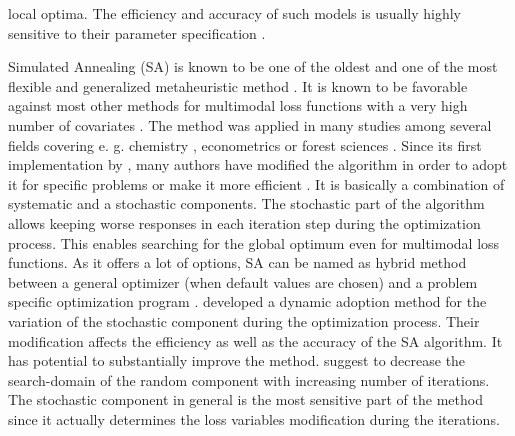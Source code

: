 local optima. The efficiency and accuracy of such models is usually highly sensitive to their parameter specification \citep{corana_1987}.

Simulated Annealing (SA) \citep{kirkpatrick_1983} is known to be one of the oldest and one of the most flexible and generalized metaheuristic method \citep{blum_2003}. It is known to be favorable against most other methods for multimodal loss functions with a very high number of covariates \citep{corana_1987}. The method was applied in many studies among several fields covering e. g. chemistry \citep{agostini_2006}, econometrics \citep{ingber_1993} or forest sciences \citep{baskent_2002}. Since its first implementation by \citet{kirkpatrick_1983}, many authors have modified the algorithm in order to adopt it for specific problems \citep[e. g.][]{desarbo_1989, goffe_1996} or make it more efficient \citep[e. g.][]{xiang_2013}. It is basically a combination of systematic and a stochastic components. The stochastic part of the algorithm allows keeping worse responses in each iteration step during the optimization process. This enables searching for the global optimum even for multimodal loss functions. As it offers a lot of options, SA can be named as hybrid method between a general optimizer (when default values are chosen) and a problem specific optimization program \citep{wegener_2005}. \citet{corana_1987} developed a dynamic adoption method for the variation of the stochastic component during the optimization process. Their modification affects the efficiency as well as the accuracy of the SA algorithm. It has potential to substantially improve the method. \citet{pronzato_1984} suggest to decrease the search-domain of the random component with increasing number of iterations. The stochastic component in general is the most sensitive part of the method since it actually determines the loss variables modification during the iterations.

